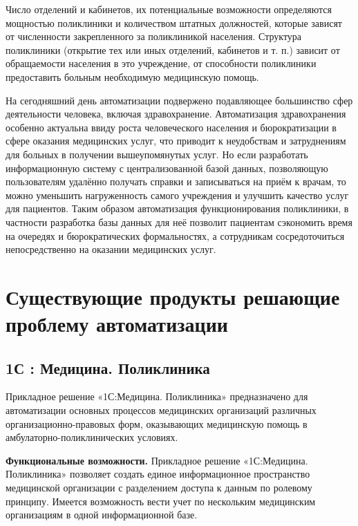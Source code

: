 \documentclass[14pt,a4paper,russian]{extreport}
\begin{document}
Число отделений и кабинетов, их потенциальные возможности определяются мощностью поликлиники и
количеством штатных должностей, которые зависят от численности закрепленного за
поликлиникой населения. Структура поликлиники (открытие тех или иных отделений, кабинетов и
т. п.) зависит от обращаемости населения в это учреждение, от способности поликлиники предоставить
больным необходимую медицинскую помощь.\cite{medstat}

На сегодняшний день автоматизации подвержено подавляющее большинство сфер деятельности человека,
включая здравохранение. Автоматизация здравохранения особенно актуальна ввиду роста человеческого населения
и бюрократизации в сфере оказания медицинских услуг, что приводит к неудобствам и
затруднениям для больных
в получении вышеупомянутых услуг. Но если разработать информационную систему с
централизованной базой данных, позволяющую пользователям удалённо получать справки и записываться
на приём к
врачам, то можно уменьшить нагруженность самого учреждения и улучшить качество услуг для
пациентов. Таким образом автоматизация функционирования
поликлиники, в частности разработка базы данных для неё позволит пациентам сэкономить время на
очередях и бюрократических формальностях, а сотрудникам сосредоточиться непосредственно на
оказании медицинских услуг.


\newpage
\section{Существующие продукты решающие проблему автоматизации}

\subsection{1С : Медицина. Поликлиника}
Прикладное решение «1С:Медицина. Поликлиника» предназначено для автоматизации основных процессов
медицинских организаций различных организационно-правовых форм, оказывающих медицинскую помощь в
амбулаторно-поликлинических условиях. 

\textbf{Функциональные возможности.} 
Прикладное решение «1С:Медицина. Поликлиника» позволяет создать единое информационное пространство
медицинской организации с разделением доступа к данным по ролевому принципу. Имеется возможность
вести учет по нескольким медицинским организациям в одной информационной базе.
\end{document}
